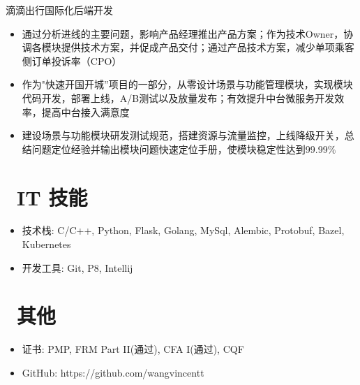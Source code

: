 \documentclass{resume}
\begin{document}
滴滴出行国际化后端开发
\begin{itemize}
  \item 通过分析进线的主要问题，影响产品经理推出产品方案；作为技术Owner，协调各模块提供技术方案，并促成产品交付；通过产品技术方案，减少单项乘客侧订单投诉率（CPO）
  \item 作为"快速开国开城”项目的一部分，从零设计场景与功能管理模块，实现模块代码开发，部署上线，A/B测试以及放量发布；有效提升中台微服务开发效率，提高中台接入满意度
  \item 建设场景与功能模块研发测试规范，搭建资源与流量监控，上线降级开关，总结问题定位经验并输出模块问题快速定位手册，使模块稳定性达到99.99\%
\end{itemize}



\section{\faCogs\ IT 技能}
\begin{itemize}[parsep=0.5ex]
  \item 技术栈: C/C++, Python, Flask, Golang, MySql, Alembic, Protobuf, Bazel, Kubernetes
  \item 开发工具: Git, P8, Intellij
\end{itemize}

\section{\faInfo\ 其他}
\begin{itemize}[parsep=0.5ex]
  \item 证书: PMP, FRM Part II(通过), CFA I(通过), CQF
  \item GitHub: https://github.com/wangvincentt
\end{itemize}

%
%
\end{document}
